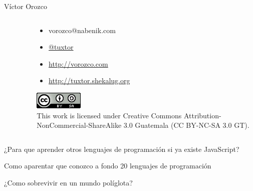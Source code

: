 \documentclass[aspectratio=169]{beamer}
\begin{document}
\begin{frame}{Víctor Orozco}
\begin{columns}[T]
\begin{column}[T]{4cm}
\begin{figure}
            \end{figure}
        \end{column}
        \begin{column}[T]{6cm} %
            \begin{itemize}
                \item vorozco@nabenik.com
                \item \href{https://twitter.com/tuxtor}{@tuxtor}
                \item \href{http://vorozco.com}{http://vorozco.com}
                \item \href{http://tuxtor.shekalug.org}{http://tuxtor.shekalug.org}
            \end{itemize}
            \begin{center}
                \includegraphics[width=0.1\linewidth]{Images/cclogo}
                \\
                This work is licensed under Creative Commons Attribution-NonCommercial-ShareAlike 3.0 Guatemala (CC BY-NC-SA 3.0 GT).
            \end{center}
        \end{column}
    \end{columns}
\end{frame}

\begin{frame}
    \huge ¿Para que aprender otros lenguajes de programación si ya existe JavaScript?
\end{frame}

\begin{frame}
    \huge Como aparentar que conozco a fondo 20 lenguajes de programación
\end{frame}

\begin{frame}
    \huge ¿Como sobrevivir en un mundo políglota?
\end{frame}
\end{document}
